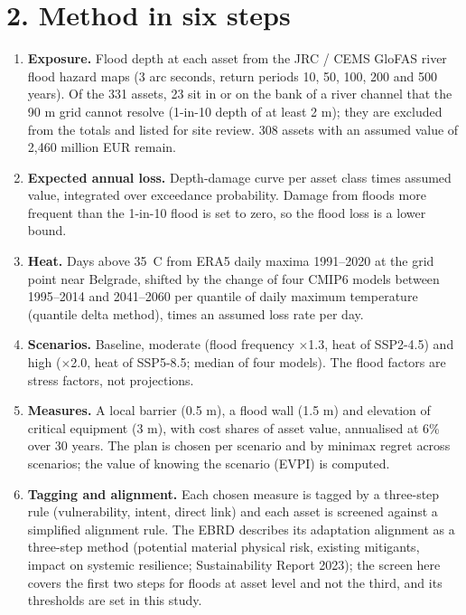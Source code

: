 \documentclass[11pt,a4paper]{article}
\begin{document}
\section*{2. Method in six steps}
\begin{enumerate}
\setlength\itemsep{1pt}
\item \textbf{Exposure.} Flood depth at each asset from the JRC / CEMS GloFAS river flood hazard maps (3 arc seconds, return periods 10, 50, 100, 200 and 500 years). Of the 331 assets, 23 sit in or on the bank of a river channel that the 90 m grid cannot resolve (1-in-10 depth of at least 2 m); they are excluded from the totals and listed for site review. 308 assets with an assumed value of 2,460 million EUR remain.
\item \textbf{Expected annual loss.} Depth-damage curve per asset class times assumed value, integrated over exceedance probability. Damage from floods more frequent than the 1-in-10 flood is set to zero, so the flood loss is a lower bound.
\item \textbf{Heat.} Days above 35~\textdegree C from ERA5 daily maxima 1991--2020 at the grid point near Belgrade, shifted by the change of four CMIP6 models between 1995--2014 and 2041--2060 per quantile of daily maximum temperature (quantile delta method), times an assumed loss rate per day.
\item \textbf{Scenarios.} Baseline, moderate (flood frequency $\times$1.3, heat of SSP2-4.5) and high ($\times$2.0, heat of SSP5-8.5; median of four models). The flood factors are stress factors, not projections.
\item \textbf{Measures.} A local barrier (0.5 m), a flood wall (1.5 m) and elevation of critical equipment (3 m), with cost shares of asset value, annualised at 6\% over 30 years. The plan is chosen per scenario and by minimax regret across scenarios; the value of knowing the scenario (EVPI) is computed.
\item \textbf{Tagging and alignment.} Each chosen measure is tagged by a three-step rule (vulnerability, intent, direct link) and each asset is screened against a simplified alignment rule. The EBRD describes its adaptation alignment as a three-step method (potential material physical risk, existing mitigants, impact on systemic resilience; Sustainability Report 2023); the screen here covers the first two steps for floods at asset level and not the third, and its thresholds are set in this study.
\end{enumerate}
\end{document}
